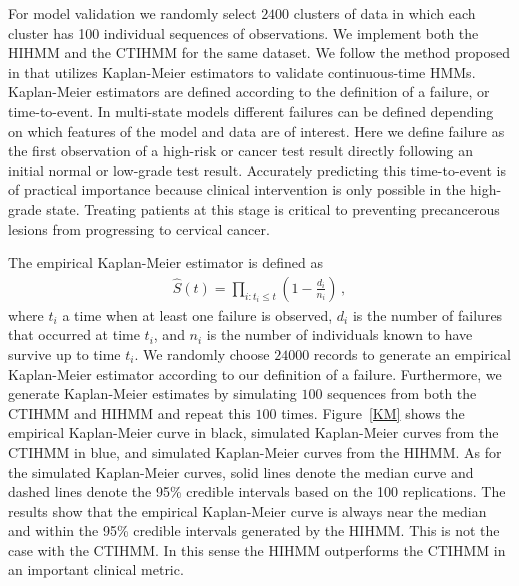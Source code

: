 \documentclass{article}
\begin{document}
For model validation we randomly select $2400$ clusters of data in which each cluster has 100 individual sequences of observations. We implement both the HIHMM and the CTIHMM for the same dataset. We follow the method proposed in \cite{titman_general_2008} that utilizes Kaplan-Meier estimators to validate continuous-time HMMs. Kaplan-Meier estimators are defined according to the definition of a failure, or time-to-event. In multi-state models different failures can be defined depending on which features of the model and data are of interest. Here we define failure as the first observation of a high-risk or cancer test result directly following an initial normal or low-grade test result.  Accurately predicting this time-to-event is of practical importance because clinical intervention is only possible in the high-grade state.  Treating patients at this stage is critical to preventing precancerous lesions from progressing to cervical cancer. 

The empirical Kaplan-Meier estimator is defined as 
\begin{eqnarray*}
	\hat{S}(t) = \prod_{i: t_i\leq t}\left(1 - \frac{d_i}{n_i}\right)\,,
\end{eqnarray*}
where $t_i$ a time when at least one failure is observed, $d_i$ is the number of failures that occurred at time $t_i$, and $n_i$ is the number of individuals known to have survive up to time $t_i$. We randomly choose $24000$ records to generate an empirical Kaplan-Meier estimator according to our definition of a failure. Furthermore, we generate Kaplan-Meier estimates by simulating $100$ sequences from both the CTIHMM and HIHMM and repeat this $100$ times. Figure~\ref{KM} shows the empirical Kaplan-Meier curve in black, simulated Kaplan-Meier curves from the CTIHMM in blue, and simulated Kaplan-Meier curves from the HIHMM. As for the simulated Kaplan-Meier curves, solid lines denote the median curve and dashed lines denote the 95\% credible intervals based on the 100 replications. The results show that the empirical Kaplan-Meier curve is always near the median and within the 95\% credible intervals generated by the HIHMM. This is not the case with the CTIHMM. In this sense the HIHMM outperforms the CTIHMM in an important clinical metric.
\end{document}
